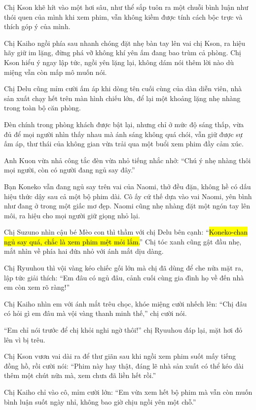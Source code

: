 \documentclass[../main.tex]{subfiles}
\begin{document}
Chị Kson khẽ hít vào một hơi sâu, như thể sắp tuôn ra một chuỗi bình luận như thói quen của mình khi xem phim, vẫn không kiềm được tính cách bộc trực và thích góp ý của mình.

Chị Kaiho ngồi phía sau nhanh chóng đặt nhẹ bàn tay lên vai chị Kson, ra hiệu hãy giữ im lặng, đừng phá vỡ không khí yên ấm đang bao trùm cả phòng. Chị Kson hiểu ý ngay lập tức, ngồi yên lặng lại, không dám nói thêm lời nào dù miệng vẫn còn mấp mô muốn nói.

Chị Delu cũng mỉm cười ấm áp khi dòng tên cuối cùng của dàn diễn viên, nhà sản xuất chạy hết trên màn hình chiếu lớn, để lại một khoảng lặng nhẹ nhàng trong toàn bộ căn phòng.

Đèn chính trong phòng khách được bật lại, nhưng chỉ ở mức độ sáng thấp, vừa đủ để mọi người nhìn thấy nhau mà ánh sáng không quá chói, vẫn giữ được sự ấm áp, thư thái của không gian vừa trải qua một buổi xem phim đầy cảm xúc.

Anh Kuon vừa nhả công tắc đèn vừa nhỏ tiếng nhắc nhở: ``Chú ý nhẹ nhàng thôi mọi người, còn có người đang ngủ say đây.''

Bạn Koneko vẫn đang ngủ say trên vai của Naomi, thở đều đặn, không hề có dấu hiệu thức dậy sau cả một bộ phim dài. Cô ấy cứ thế dựa vào vai Naomi, yên bình như đang ở trong một giấc mơ đẹp. Naomi cũng nhẹ nhàng đặt một ngón tay lên môi, ra hiệu cho mọi người giữ giọng nhỏ lại.

Chị Suzuno nhìn cậu bé Mèo con thì thầm với chị Delu bên cạnh: ``\hl{Koneko-chan ngủ say quá, chắc là xem phim mệt mỏi lắm.}'' Chị tóc xanh cũng gật đầu nhẹ, mắt nhìn về phía hai đứa nhỏ với ánh mắt dịu dàng.

Chị Ryuuhou thì vội vàng kéo chiếc gối lớn mà chị đã dùng để che nửa mặt ra, lập tức giải thích: ``Em đâu có ngủ đâu, cảnh cuối cùng gia đình họ về đến nhà em còn xem rõ ràng!''

Chị Kaiho nhìn em với ánh mắt trêu chọc, khóe miệng cười nhếch lên: ``Chị đâu có hỏi gì em đâu mà vội vàng thanh minh thế,'' chị cười nói.

``Em chỉ nói trước để chị khỏi nghi ngờ thôi!'' chị Ryuuhou đáp lại, mặt hơi đỏ lên vì bị trêu.

Chị Kson vươn vai dài ra để thư giãn sau khi ngồi xem phim suốt mấy tiếng đồng hồ, rồi cười nói: ``Phim này hay thật, đáng lẽ nhà sản xuất có thể kéo dài thêm một chút nữa mà, xem chưa đã liền hết rồi.''

Chị Kaiho chỉ vào cô, mỉm cười lớn: ``Em vừa xem hết bộ phim mà vẫn còn muốn bình luận suốt ngày nhỉ, không bao giờ chịu ngồi yên một chỗ.''
\end{document}
